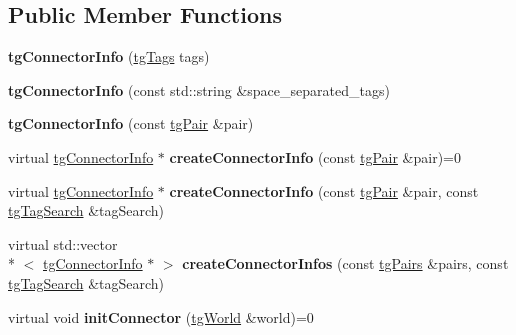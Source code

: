 \subsection*{Public Member Functions}
\begin{DoxyCompactItemize}
\item 
\hypertarget{classtg_connector_info_a9eb9cd0ce0d201cdb692819367249c42}{{\bfseries tg\-Connector\-Info} (\hyperlink{classtg_tags}{tg\-Tags} tags)}\label{classtg_connector_info_a9eb9cd0ce0d201cdb692819367249c42}

\item 
\hypertarget{classtg_connector_info_a379493247db67ee91e1f2c892bd7658a}{{\bfseries tg\-Connector\-Info} (const std\-::string \&space\-\_\-separated\-\_\-tags)}\label{classtg_connector_info_a379493247db67ee91e1f2c892bd7658a}

\item 
\hypertarget{classtg_connector_info_aced6cf76e20954ea1de93210fe6ded7a}{{\bfseries tg\-Connector\-Info} (const \hyperlink{classtg_pair}{tg\-Pair} \&pair)}\label{classtg_connector_info_aced6cf76e20954ea1de93210fe6ded7a}

\item 
\hypertarget{classtg_connector_info_ab7605039a411b914a1ee32dcef7e8b2c}{virtual \hyperlink{classtg_connector_info}{tg\-Connector\-Info} $\ast$ {\bfseries create\-Connector\-Info} (const \hyperlink{classtg_pair}{tg\-Pair} \&pair)=0}\label{classtg_connector_info_ab7605039a411b914a1ee32dcef7e8b2c}

\item 
\hypertarget{classtg_connector_info_a4442bb9d3c65ad34ae6503fbfb02b411}{virtual \hyperlink{classtg_connector_info}{tg\-Connector\-Info} $\ast$ {\bfseries create\-Connector\-Info} (const \hyperlink{classtg_pair}{tg\-Pair} \&pair, const \hyperlink{classtg_tag_search}{tg\-Tag\-Search} \&tag\-Search)}\label{classtg_connector_info_a4442bb9d3c65ad34ae6503fbfb02b411}

\item 
\hypertarget{classtg_connector_info_af37c4e90660799cf6ef81528cdd39940}{virtual std\-::vector\\*
$<$ \hyperlink{classtg_connector_info}{tg\-Connector\-Info} $\ast$ $>$ {\bfseries create\-Connector\-Infos} (const \hyperlink{classtg_pairs}{tg\-Pairs} \&pairs, const \hyperlink{classtg_tag_search}{tg\-Tag\-Search} \&tag\-Search)}\label{classtg_connector_info_af37c4e90660799cf6ef81528cdd39940}

\item 
\hypertarget{classtg_connector_info_aed768bf455d83c21dd777c82e61f65e7}{virtual void {\bfseries init\-Connector} (\hyperlink{classtg_world}{tg\-World} \&world)=0}\label{classtg_connector_info_aed768bf455d83c21dd777c82e61f65e7}


\end{DoxyCompactItemize}
